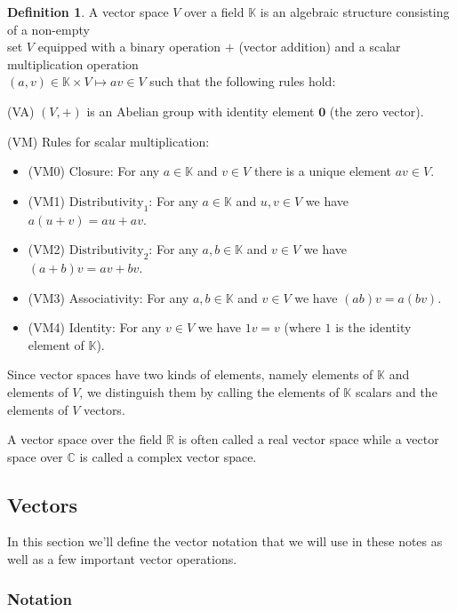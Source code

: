 \documentclass{article}
\theoremstyle{definition}
\newtheorem{definition}{Definition}[section]
\begin{document}
\smallskip
\begin{definition}
A vector space $V$ over a field $\mathbb{K}$ is an algebraic structure consisting 
of a non-empty \\ set $V$ equipped with a binary operation $+$ (vector addition) 
and a scalar multiplication operation \\
$(a,v) \in \mathbb{K} \times V \mapsto av \in V$
such that the following rules hold:


\bigskip
\noindent
(VA) $(V,+)$ is an Abelian group with identity element $\mathbf{0}$ (the zero vector). 

\bigskip
\noindent
(VM) Rules for scalar multiplication:

\medskip
\begin{itemize}
\item [] (VM0) Closure: For any $a   \in \mathbb{K}$ and $v \in V$ there is a unique element $av \in V$.
\item [] (VM1) $\text{Distributivity}_{1}$: For any $a \in \mathbb{K}$ and $u,v \in V$ we have $a(u+v)=au+av$.
\item [] (VM2) $\text{Distributivity}_{2}$: For any $a,b \in \mathbb{K}$ and $v \in V$ we have $(a+b)v=av+bv$.
\item [] (VM3) Associativity: For any $a,b \in \mathbb{K}$ and $v \in V$ we have $(ab)v=a(bv)$.
\item [] (VM4) Identity: For any $v \in V$ we have $1v = v$ (where $1$ is the identity element of $\mathbb{K}$).
\end{itemize}
\end{definition}

\medskip
\noindent
Since vector spaces have two kinds of elements, namely elements of $\mathbb{K}$ and 
elements of $V$, we distinguish them by calling the elements of $\mathbb{K}$ scalars 
and the elements of $V$ vectors.

\bigskip
\noindent
A vector space over the field $\mathbb{R}$ is often called a real vector space 
while a vector space over $\mathbb{C}$ is called a complex vector space.

\subsection{Vectors}
In this section we'll define the vector notation that we will use in these
notes as well as a few important vector operations.

\smallskip
\subsubsection{Notation} 
\end{document}

